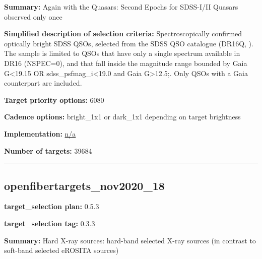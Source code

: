 \noindent\textbf{Summary:} Again with the Quasars: Second Epochs for SDSS-I/II
Quasars observed only once

\noindent\textbf{Simplified description of selection criteria:} Spectroscopically
confirmed optically bright SDSS QSOs, selected from the SDSS QSO
catalogue (DR16Q,
\citealt{Lyke2020}). The sample is limited to QSOs that have only a single
spectrum available in DR16 (NSPEC=0), and that fall inside the magnitude
range bounded by Gaia G\textless19.15 OR sdss\_psfmag\_i\textless19.0
and Gaia G\textgreater12.5;. Only QSOs with a Gaia counterpart are
included.


\noindent\textbf{Target priority options:} 6080

\noindent\textbf{Cadence options:} bright\_1x1 or dark\_1x1 depending on target
brightness

\noindent\textbf{Implementation:}
\href{https://github.com/sdss/target_selection/blob/0.3.3/python/target_selection/cartons/n/a}{n/a}

\noindent\textbf{Number of targets:} 39684

\begin{center}\rule{0.5\linewidth}{0.5pt}\end{center}

\hypertarget{openfibertargets_nov2020_18_plan0.5.3}{%
\subsection{openfibertargets\_nov2020\_18}\label{openfibertargets_nov2020_18_plan0.5.3}}

\noindent\textbf{target\_selection plan:} 0.5.3

\noindent\textbf{target\_selection tag:}
\href{https://github.com/sdss/target_selection/tree/0.3.3/}{0.3.3}

\noindent\textbf{Summary:} Hard X-ray sources: hard-band selected X-ray sources
(in contrast to soft-band selected eROSITA sources)

